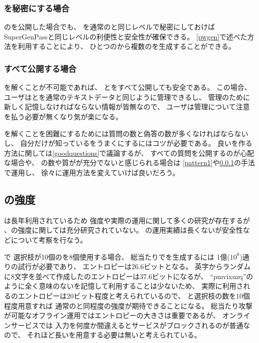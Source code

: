 \documentclass[twoside]{wiss}
\begin{document}
\subsubsection{{\SS}を秘密にする場合}
\label{pattern2}

{\EP}の{\SQ}を公開した場合でも、
{\SS}を通常の{\PW}と同じレベルで秘密にしておけば
SuperGenPass\cite{SuperGenPass}と同じレベルの利便性と安全性が確保できる。
\ref{pwgen}で述べた方法を利用することにより、
ひとつの{\SS}から複数の{\PW}を生成することができる。

\subsubsection{すべて公開する場合}
\label{pattern3}

{\SQ}を解くことが不可能であれば、
{\SS}と{\SQ}をすべて公開しても安全である。
この場合、
ユーザは{\SQ}と{\SS}を通常のテキストデータと同じように管理できるし、
{\PW}管理のために新しく記憶しなければならない情報が皆無なので、
ユーザは{\PW}管理について注意を払う必要が無くなり気が楽になる。

{\SQ}を解くことを困難にするためには質問の数と偽答の数が多くなければならないし、
自分だけが知っている{\EM}をうまく{\SQ}にするにはコツが必要である。
良い{\SQ}を作る方法に関しては\ref{goodquestions}で議論するが、
すべての質問を公開するのが心配な場合や、
{\SQ}の数や質がが充分でないと感じられる場合は
\ref{pattern1}や\ref{pattern2}の手法で運用し、
徐々に運用方法を変えていけば良いだろう。

\subsection{{\SQ}の強度}



{\PW}は長年利用されているため
強度や実際の運用に関して多くの研究が存在するが%
\cite{Hayashi:2011:DSP:1978942.1979326}%
\cite{Komanduri:2011:PPM:1978942.1979321}%
、{\SQ}の強度に関しては充分研究されていない。
{\EP}の運用実績は長くないが安全性などについて考察を行なう。

{\EP}で
選択枝が10個の{\SQ}を8個使用する場合、
総当たりで{\PW}を生成するには
1億($10^8$)通りの試行が必要であり、
エントロピーは26.6ビットとなる。
英字からランダムに8文字を並べて作成した{\PW}のエントロピーは37.6ビットになるが、
``\textsf{pmvixuzq}''のように全く意味のない{\PW}を記憶して利用することは少ないため、
実際に利用される{\PW}のエントロピーは20ビット程度と考えられているので\cite{NIST}、
{\SQ}と選択枝の数を10個程度用意すれば
通常の{\PW}と同程度の強度が期待できることになる。
%
総当たり攻撃が可能なオフライン運用ではエントロピーの大きさは重要であるが、
オンラインサービスでは
{\PW}入力を何度か間違えるとサービスがブロックされるのが普通なので、
それほど長い{\PW}を用意する必要は無いと考えられている\cite{Florencio:2007:SWP:1361419.1361429}。
\end{document}
